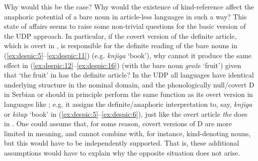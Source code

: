 \documentclass[output=paper,
modfonts
]{langscibook}
\begin{document}
	Why would this be the case? Why would the existence of kind-reference affect the
	anaphoric potential of a bare noun in article-less languages in such a way? This state of affairs
	seems to raise some non-trivial questions for the basic version of the UDP approach. In
	particular, if the covert version of the definite article, which is overt in , is responsible for
	the definite reading of the bare nouns in (\ref{ex:despic:5}--\ref{ex:despic:11}) (e.g. \textit{knjiga} `book'), why cannot it produce the
	same effect in (\ref{ex:despic:12}--\ref{ex:despic:16}) (with the bare noun \textit{gro\v z\dj e} `fruit') given that `the fruit' in   has the definite article? In the UDP all languages have identical underlying structure in the
	nominal domain, and the phonologically null/covert D in Serbian or  should in principle
	perform the same function as its overt version in languages like ; e.g. it assigns the
	definite/anaphoric interpretation to, say, \textit{knjiga} or \textit{kitap} `book' in (\ref{ex:despic:5}--\ref{ex:despic:6}), just like the overt
	article \textit{the} does in . One could assume that, for some reason, covert versions of D are more limited in meaning, and cannot combine with, for instance, kind-denoting nouns, but this would have to be independently supported. That is, these additional assumptions would have to explain why the opposite situation does not arise.
	
\end{document}
